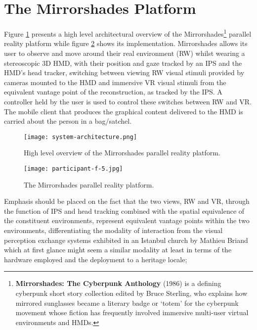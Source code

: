 \section{The Mirrorshades Platform}
\label{the-mirrorshades-platform}
Figure \ref{systemarchitecture} presents a high level architectural overview of the Mirrorshades\footnote{\textbf{Mirrorshades: The Cyberpunk Anthology} (1986) is a defining cyberpunk short story collection edited by Bruce Sterling, who explains how mirrored sunglasses became a literary badge or `totem' for the cyberpunk movement whose fiction has frequently involved immersive multi-user virtual environments and HMDs.} parallel reality platform while figure \ref{participant-f-5.jpg} shows its implementation. Mirrorshades allows its user to observe and move around their real environment (RW) whilst wearing a stereoscopic 3D HMD, with their position and gaze tracked by an IPS and the HMD's head tracker, switching between viewing RW visual stimuli provided by cameras mounted to the HMD and immersive VR visual stimuli from the equivalent vantage point of the reconstruction, as tracked by the IPS. A controller held by the user is used to control these switches between RW and VR. The mobile client that produces the graphical content delivered to the HMD is carried about the person in a bag/satchel.

\begin{figure}[h]
	\begin{center}
		\texttt{[image: system-architecture.png]}
		\caption{High level overview of the Mirrorshades parallel reality platform.}
		\label{systemarchitecture}
	\end{center}
\end{figure}

\begin{figure}[h]
	\begin{center}
		\texttt{[image: participant-f-5.jpg]}
		\caption{The Mirrorshades parallel reality platform.}
		\label{participant-f-5.jpg}
	\end{center}
\end{figure}

Emphasis should be placed on the fact that the two views, RW and VR, through the function of IPS and head tracking combined with the spatial equivalence of the constituent environments, represent equivalent vantage points within the two environments, differentiating the modality of interaction from the visual perception exchange systems exhibited in an Istanbul church by Mathieu Briand which at first glance might seem a similar modality at least in terms of the hardware employed and the deployment to a heritage locale;

